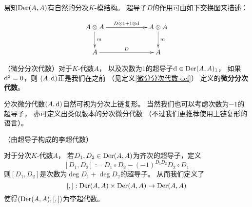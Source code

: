 易知$\operatorname{Der}(A,A)$有自然的分次$K$-模结构。
超导子$D$的作用可由如下交换图来描述：

$$
  \xymatrixcolsep{5pc}
  \xymatrix{
       A\ten A  \ar[r]^-{D\ten 1+1\ten\td}  \ar[d]^-m
     & A\ten A                              \ar[d]^-m
  \\
       A        \ar[r]^-{D}
     & A
  }
$$

\begin{rem}（微分分次代数）对于$K$-代数$A$，
以及次数为$1$的超导子$\mathrm{d}\in\operatorname{Der}(A,A)_1$，
如果$\mathrm{d}^2=0$，则
$(A,\mathrm{d})$正是我们在之前
（见定义\ref{微分分次代数-def}）
定义的\textbf{微分分次代数}。
\end{rem}
分次微分代数$(A,\mathrm{d})$自然可视为分次上链复形。
当然我们也可以考虑次数为$-1$的超导子，
亦可定义出类似版本的分次微分代数
（不过我们更推荐使用上链复形的语言）。

\begin{lemma}（由超导子构成的李超代数）

对于分次$K$-代数$A$，
若$D_1,D_2\in\operatorname{Der}(A,A)$为齐次的超导子，定义
$$[D_1,D_2]:=D_1\circ D_2-(-1)^{D_1D_2}D_2\circ D_1$$
则$[D_1,D_2]$是次数为$\deg D_1+\deg D_2$的超导子。
从而我们定义了
$$[,]:\operatorname{Der}(A,A)\times\operatorname{Der}(A,A)\to\operatorname{Der}(A,A)$$
使得$(\operatorname{Der}(A,A),[,])$为李超代数。
\end{lemma}

